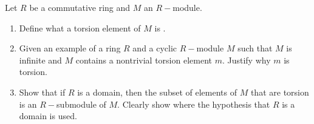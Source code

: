 \begin{problem}
Let $R$ be a commutative ring and $M$ an $R-$module.
\begin{enumerate}
    \item Define what a torsion element of $M$ is .
    \item Given an example of a ring $R$ and a cyclic $R-$module $M$ such that $M$ is infinite and $M$ contains a nontrivial torsion element $m$.
    Justify why $m$ is torsion.
    \item Show that if $R$ is a domain, then the subset of elements of $M$ that are torsion is an $R-$submodule of $M$. Clearly show where the hypothesis that $R$ is a domain is used.
\end{enumerate}
\end{problem}
